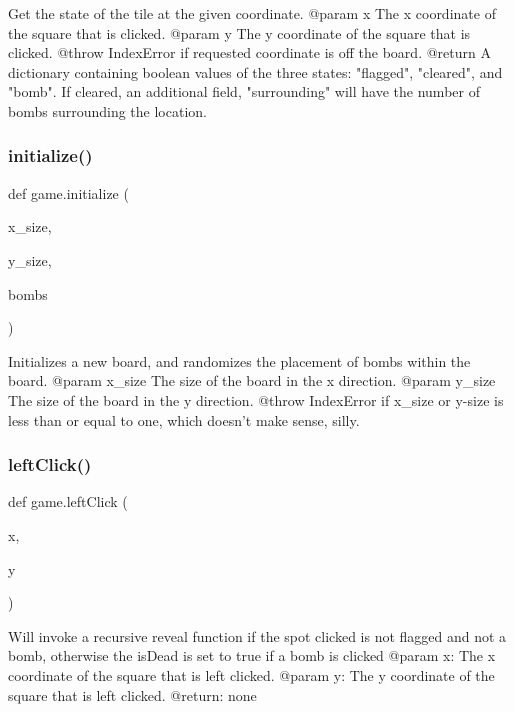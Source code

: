 \begin{DoxyVerb}Get the state of the tile at the given coordinate.
@param x The x coordinate of the square that is clicked.
@param y The y coordinate of the square that is clicked.
@throw IndexError if requested coordinate is off the board.
@return A dictionary containing boolean values of the three states: "flagged", "cleared", and "bomb". If cleared, an additional field, "surrounding" will have the number of bombs surrounding the location.
\end{DoxyVerb}
 \mbox{\label{namespacegame_aeff970ada18ae074610055efd1094336}} 
\subsubsection{\texorpdfstring{initialize()}{initialize()}}
{\footnotesize\ttfamily def game.\+initialize (\begin{DoxyParamCaption}\item[{}]{x\+\_\+size,  }\item[{}]{y\+\_\+size,  }\item[{}]{bombs }\end{DoxyParamCaption})}

\begin{DoxyVerb}Initializes a new board, and randomizes the placement of bombs within the board.
@param x_size The size of the board in the x direction.
@param y_size The size of the board in the y direction.
@throw IndexError if x_size or y-size is less than or equal to one, which doesn't make sense, silly.
\end{DoxyVerb}
 \mbox{\label{namespacegame_abe058d32c820bac4e3cef6d7fe4a46a9}} 
\subsubsection{\texorpdfstring{leftClick()}{leftClick()}}
{\footnotesize\ttfamily def game.\+left\+Click (\begin{DoxyParamCaption}\item[{}]{x,  }\item[{}]{y }\end{DoxyParamCaption})}

\begin{DoxyVerb}Will invoke a recursive reveal function if the spot clicked
is not flagged and not a bomb, otherwise the isDead is set
to true if a bomb is clicked
@param x: The x coordinate of the square that is left clicked.
@param y: The y coordinate of the square that is left clicked.
@return: none
\end{DoxyVerb}
 \mbox{\label{namespacegame_a2037de1992c21b7b89134d2523e2613a}} 
